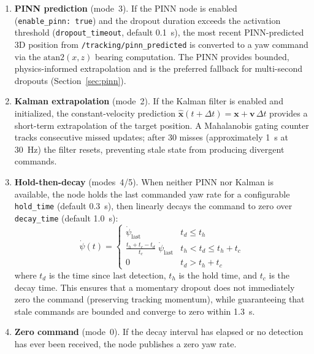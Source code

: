 \documentclass[11pt,letterpaper]{article}
\begin{document}
\begin{enumerate}
    \item \textbf{PINN prediction} (mode~3).  If the PINN node is
          enabled (\texttt{enable\_pinn:\ true}) and the dropout
          duration exceeds the activation threshold
          (\texttt{dropout\_timeout}, default 0.1~s), the most recent
          PINN-predicted 3D position from
          \texttt{/tracking/pinn\_predicted} is converted to a yaw
          command via the $\mathrm{atan2}(x,z)$ bearing computation.
          The PINN provides bounded, physics-informed extrapolation
          and is the preferred fallback for multi-second dropouts
          (Section~\ref{sec:pinn}).

    \item \textbf{Kalman extrapolation} (mode~2).  If the Kalman filter
          is enabled and initialized, the constant-velocity prediction
          $\hat{\mathbf{x}}(t + \Delta t) = \mathbf{x} + \mathbf{v}\,
          \Delta t$ provides a short-term extrapolation of the target
          position.  A Mahalanobis gating counter tracks consecutive
          missed updates; after 30 misses (approximately 1~s at
          30~Hz) the filter resets, preventing stale state from
          producing divergent commands.

    \item \textbf{Hold-then-decay} (modes~4/5).  When neither PINN nor
          Kalman is available, the node holds the last commanded yaw
          rate for a configurable \texttt{hold\_time} (default 0.3~s),
          then linearly decays the command to zero over
          \texttt{decay\_time} (default 1.0~s):
          \begin{equation}
              \dot{\psi}(t) =
              \begin{cases}
                  \dot{\psi}_{\mathrm{last}} & t_d \leq t_h \\[2pt]
                  \displaystyle\frac{t_h + t_c - t_d}{t_c}\;\dot{\psi}_{\mathrm{last}}
                                              & t_h < t_d \leq t_h + t_c \\[4pt]
                  0                           & t_d > t_h + t_c
              \end{cases}
              \label{eq:hold_decay}
          \end{equation}
          where $t_d$ is the time since last detection, $t_h$ is the
          hold time, and $t_c$ is the decay time.
          This ensures that a momentary dropout does not immediately zero
          the command (preserving tracking momentum), while guaranteeing
          that stale commands are bounded and converge to zero within
          1.3~s.

    \item \textbf{Zero command} (mode~0).  If the decay interval has
          elapsed or no detection has ever been received, the node
          publishes a zero yaw rate.
\end{enumerate}
\end{document}

